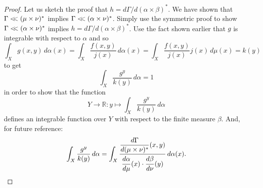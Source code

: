 \documentclass[
twoside=true,
paper=letter,
fontsize=9pt,
pagesize=auto,
leqno,
openany,
headsepline,
overfullrule,
]{scrbook}
\theoremstyle{plain}
\theoremstyle{plain}
\theoremstyle{definition}
\theoremstyle{bfnoteitalic}
\theoremstyle{bfnoteroman}
\newcommand{\R}{\mathbb{R}}
\newcommand{\lilstrut}{\vphantom{\bigl(}}
\newcommand{\funcf}{f}
\newcommand{\funcg}{g}
\newcommand{\funcj}{j}
\newcommand{\funck}{k}
\newcommand{\functioniii}{h}
\newcommand{\measurespace}{X}
\newcommand{\measurespaceii}{Y}
\newcommand{\mspaceelt}{x}
\newcommand{\mspaceeltii}{y}
\newcommand{\abscont}{\mathrel{< \kern-3.5pt <}}
\newcommand{\measure}{\mu}
\newcommand{\measmu}{\mu}
\newcommand{\measureii}{\nu}
\newcommand{\measnu}{\nu}
\newcommand{\joint}{\Gamma}%
\newcommand{\measonprod}{\Gamma}%
\newcommand{\marginalone}{\alpha}%
\newcommand{\marginaltwo}{\beta}%
\begin{document}
\begin{proof}
Let us sketch the proof that
$\functioniii
=
d\measonprod / d(\marginalone\times\marginaltwo)^*$.
We have shown that 
$\measonprod \abscont (\measure\times\measureii)^*$
implies
$\measonprod \abscont (\marginalone\times\measureii)^*$. 
Simply use the symmetric proof to show 
$\measonprod \abscont (\marginalone\times\measureii)^*$
implies
$\functioniii
=
d\measonprod / d(\marginalone\times\marginaltwo)^*$.
Use the fact shown earlier that 
$\funcg$ is integrable with respect to $\marginalone$ and so
\[
\int_\measurespace\funcg(\mspaceelt,\mspaceeltii)\,d\marginalone(\mspaceelt)
=
\int_\measurespace
\frac{\funcf(\mspaceelt,\mspaceeltii)}{\funcj(\mspaceelt)}
\,d\marginalone(\mspaceelt)
=
\int_\measurespace
\frac{\funcf(\mspaceelt,\mspaceeltii)}{\funcj(\mspaceelt)}
\funcj(\mspaceelt)
\,d\measure(\mspaceelt)
=
\funck(\mspaceeltii)
\]
to get
\[
\int_\measurespace
\frac{\funcg^\mspaceeltii}{\funck(\mspaceeltii)}
\, d\marginalone
= 1
\]
in order to show that the function 
\[
\measurespaceii\to\R :
\mspaceeltii\mapsto
\int_\measurespace
\frac{\funcg^\mspaceeltii}{\funck(\mspaceeltii)}
\, d\marginalone
\]
defines an integrable function over $\measurespaceii$ with respect to the finite measure $\marginaltwo$.
And, for future reference:
\[
\int_\measurespace
\frac{\funcg^\mspaceeltii}{\funck(\mspaceeltii)}
\, d\marginalone
=
\int_\measurespace
\frac{\dfrac{d\joint}{d(\measmu\times\measnu)^*}
(\mspaceelt,\mspaceeltii)}
{\dfrac{d\marginalone\lilstrut}{d\measmu}(\mspaceelt)
\cdot
\dfrac{d\marginaltwo\lilstrut}{d\measnu}(\mspaceeltii)}
\,d\marginalone(\mspaceelt).
\]
\end{proof}
\end{document}
